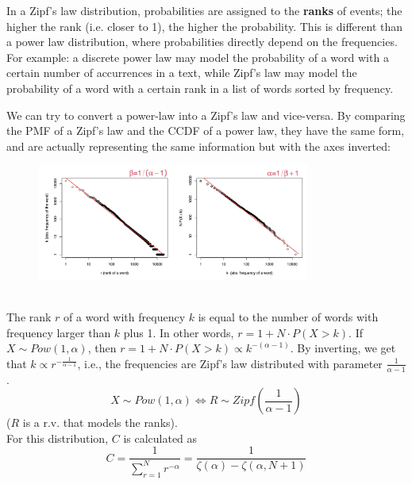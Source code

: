In a Zipf's law distribution, probabilities are assigned to the \textbf{ranks} of events; the higher the rank (i.e. closer to 1), the higher the probability. This is different than a power law distribution, where probabilities directly depend on the frequencies. For example: a discrete power law may model the probability of a word with a certain number of accurrences in a text, while Zipf's law may model the probability of a word with a certain rank in a list of words sorted by frequency.

We can try to convert a power-law into a Zipf's law and vice-versa. By comparing the PMF of a Zipf's law and the CCDF of a power law, they have the same form, and are actually representing the same information but with the axes inverted:
\begin{figure}[h]
    \centering
    \includegraphics*[width=0.8\textwidth]{img/zipf_vs_ccdf.png}
\end{figure} \\
The rank $r$ of a word with frequency $k$ is equal to the number of words with frequency larger than $k$ plus 1. In other words, $r = 1 + N \cdot P(X > k)$. If $X \sim Pow(1, \alpha)$, then $r = 1 + N \cdot P(X > k) \propto k^{-{(\alpha - 1)}}$. By inverting, we get that $k \propto r^{-\frac{1}{\alpha - 1}}$, i.e., the frequencies are Zipf's law distributed with parameter $\frac{1}{\alpha - 1}$.
\[
    X \sim Pow(1, \alpha) \iff R \sim Zipf \left (\frac{1}{\alpha - 1} \right )
\]
($R$ is a r.v. that models the ranks).\\
For this distribution, $C$ is calculated as
\begin{equation*}
    C = \frac{1}{\sum_{r=1}^{N} r^{-\alpha}} = \frac{1}{\zeta(\alpha) - \zeta(\alpha, N+1)}
\end{equation*}